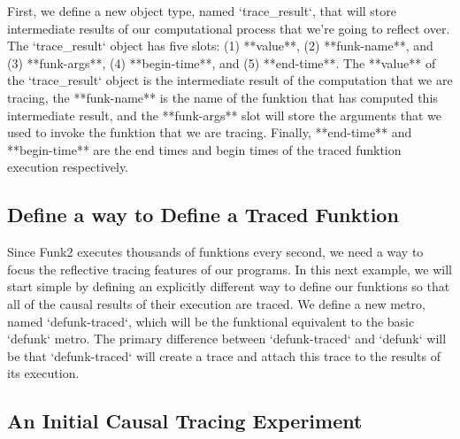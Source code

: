 First, we define a new object type, named `trace\_result`, that will
store intermediate results of our computational process that we're
going to reflect over.  The `trace\_result` object has five slots: (1)
**value**, (2) **funk-name**, and (3) **funk-args**, (4)
**begin-time**, and (5) **end-time**.  The **value** of the
`trace\_result` object is the intermediate result of the computation
that we are tracing, the **funk-name** is the name of the funktion
that has computed this intermediate result, and the **funk-args** slot
will store the arguments that we used to invoke the funktion that we
are tracing.  Finally, **end-time** and **begin-time** are the end
times and begin times of the traced funktion execution respectively.

%

\subsection{Define a way to Define a Traced Funktion}

Since Funk2 executes thousands of funktions every second, we need a
way to focus the reflective tracing features of our programs.  In this
next example, we will start simple by defining an explicitly different
way to define our funktions so that all of the causal results of their
execution are traced.  We define a new metro, named `defunk-traced`,
which will be the funktional equivalent to the basic `defunk` metro.
The primary difference between `defunk-traced` and `defunk` will be
that `defunk-traced` will create a trace and attach this trace to the
results of its execution.

%

\subsection{An Initial Causal Tracing Experiment}

